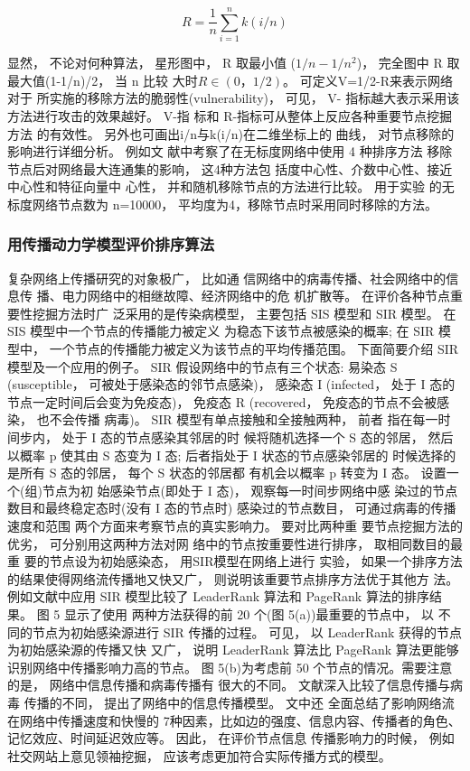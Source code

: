 				$$R=\frac{1}{n} \sum\limits_{i=1}^{n} {k(i/n)} $$

				显然， 不论对何种算法， 星形图中， R 取最小值 ($1/n-1/n^2$)， 完全图中 R 取最大值(1-1/n)/2， 当 n 比较 大时$R\in (0，1/2)$。 可定义V=1/2-R来表示网络对于 所实施的移除方法的脆弱性(vulnerability)， 可见， V- 指标越大表示采用该方法进行攻击的效果越好。 V-指 标和 R-指标可从整体上反应各种重要节点挖掘方法 的有效性。 另外也可画出i/n与k(i/n)在二维坐标上的 曲线， 对节点移除的影响进行详细分析。 例如文 献\parencite{Iyer2013Attack}中考察了在无标度网络中使用 4 种排序方法 移除节点后对网络最大连通集的影响， 这4种方法包 括度中心性、介数中心性、接近中心性和特征向量中 心性， 并和随机移除节点的方法进行比较。 用于实验 的无标度网络节点数为 n=10000， 平均度为4，移除节点时采用同时移除的方法。
	\subsubsection{用传播动力学模型评价排序算法}
	复杂网络上传播研究的对象极广\parencite{zt2005fz}， 比如通 信网络中的病毒传播\parencite{L2011Small}、社会网络中的信息传 播\parencite{BrummittPNAS}、电力网络中的相继故障\parencite{}、经济网络中的危 机扩散等\parencite{Peng2013Vaccination}。 在评价各种节点重要性挖掘方法时广 泛采用的是传染病模型， 主要包括 SIS 模型\parencite{Kitsak2010Identification}和 SIR 模型\parencite{Bonacich1972Factoring}。 在 SIS 模型中一个节点的传播能力被定义 为稳态下该节点被感染的概率; 在 SIR 模型中， 一个节点的传播能力被定义为该节点的平均传播范围。
				下面简要介绍 SIR 模型及一个应用的例子。 SIR 假设网络中的节点有三个状态: 易染态 S (susceptible， 可被处于感染态的邻节点感染)， 感染态 I (infected， 处于 I 态的节点一定时间后会变为免疫态)， 免疫态 R (recovered， 免疫态的节点不会被感染， 也不会传播 病毒)。 SIR 模型有单点接触和全接触两种\parencite{Yang2006Epidemic}， 前者 指在每一时间步内， 处于 I 态的节点感染其邻居的时 候将随机选择一个 S 态的邻居， 然后以概率 p 使其由 S 态变为 I 态; 后者指处于 I 状态的节点感染邻居的 时候选择的是所有 S 态的邻居， 每个 S 状态的邻居都 有机会以概率 p 转变为 I 态。 设置一个(组)节点为初 始感染节点(即处于 I 态)， 观察每一时间步网络中感 染过的节点数目和最终稳定态时(没有 I 态的节点时) 感染过的节点数目， 可通过病毒的传播速度和范围 两个方面来考察节点的真实影响力。 要对比两种重 要节点挖掘方法的优劣， 可分别用这两种方法对网 络中的节点按重要性进行排序， 取相同数目的最重 要的节点设为初始感染态， 用SIR模型在网络上进行 实验， 如果一个排序方法的结果使得网络流传播地又快又广， 则说明该重要节点排序方法优于其他方 法。 例如文献\parencite{L2011Leaders}中应用 SIR 模型比较了 LeaderRank 算法和 PageRank 算法的排序结果。 图 5 显示了使用 两种方法获得的前 20 个(图 5(a))最重要的节点中， 以 不同的节点为初始感染源进行 SIR 传播的过程。 可见， 以 LeaderRank 获得的节点为初始感染源的传播又快 又广， 说明 LeaderRank 算法比 PageRank 算法更能够 识别网络中传播影响力高的节点。 图 5(b)为考虑前 50 个节点的情况。需要注意的是， 网络中信息传播和病毒传播有 很大的不同。 文献\parencite{L2011Small}深入比较了信息传播与病毒 传播的不同， 提出了网络中的信息传播模型。 文中还 全面总结了影响网络流在网络中传播速度和快慢的 7种因素，比如边的强度、信息内容、传播者的角色、 记忆效应、时间延迟效应等。 因此， 在评价节点信息 传播影响力的时候， 例如社交网站上意见领袖挖掘， 应该考虑更加符合实际传播方式的模型。

